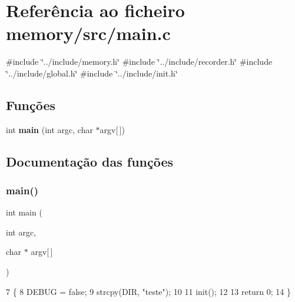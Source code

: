 \section{Referência ao ficheiro memory/src/main.c}
\label{main_8c}
{\ttfamily \#include \char`\"{}../include/memory.\+h\char`\"{}}\newline
{\ttfamily \#include \char`\"{}../include/recorder.\+h\char`\"{}}\newline
{\ttfamily \#include \char`\"{}../include/global.\+h\char`\"{}}\newline
{\ttfamily \#include \char`\"{}../include/init.\+h\char`\"{}}\newline
\subsection*{Funções}
\begin{DoxyCompactItemize}
\item 
int \textbf{ main} (int argc, char $\ast$argv[$\,$])
\end{DoxyCompactItemize}


\subsection{Documentação das funções}
\mbox{\label{main_8c_a0ddf1224851353fc92bfbff6f499fa97}} 
\subsubsection{main()}
{\footnotesize\ttfamily int main (\begin{DoxyParamCaption}\item[{int}]{argc,  }\item[{char $\ast$}]{argv[$\,$] }\end{DoxyParamCaption})}


\begin{DoxyCode}
7 \{
8     DEBUG = \textcolor{keyword}{false};
9     strcpy(DIR, \textcolor{stringliteral}{"teste"});
10 
11     init();
12 
13     \textcolor{keywordflow}{return} 0;
14 \}
\end{DoxyCode}
